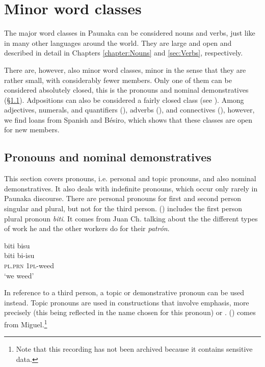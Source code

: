 
\chapter{Minor word classes}\label{chap:MinorWordClasses}

The major word classes in Paunaka can be considered nouns and verbs, just like in many other languages around the world. They are large and open and described in detail in Chapters \ref{chapter:Nouns} and \ref{sec:Verbs}, respectively.

There are, however, also minor word classes, minor in the sense that they are rather small, with considerably fewer members. Only one of them can be considered absolutely closed, this is the pronouns and nominal demonstratives (§\ref{chapter:Pronouns}). Adpositions can also be considered a fairly closed class (see ). Among adjectives, numerals, and quantifiers (), adverbs (), and connectives (), however, we find loans from Spanish and Bésiro, which shows that these classes are open for new members.


\section{Pronouns and nominal demonstratives}\label{chapter:Pronouns}

This section covers pronouns, i.e. personal and topic pronouns, and also nominal demonstratives. It also deals with indefinite pronouns, which occur only rarely in Paunaka discourse. There are personal pronouns for first and second person singular and plural, but not for the third person. () includes the first person plural pronoun \textit{biti}. It comes from Juan Ch. talking about the the different types of work he and the other workers do for their \textit{patrón}.

\ea\label{ex:new23-biti}
\begingl
\glpreamble biti bisu\\
\gla biti bi-isu\\
\textsc{pl.prn} 1\textsc{pl}-weed\\
\glft ‘we weed’
\endgl
\trailingcitation{[nxx-p630101g-1.089]}
\xe

In reference to a third person, a topic or demonstrative pronoun can be used instead. Topic pronouns are used in constructions that involve emphasis, more precisely  (this being reflected in the name chosen for this pronoun) or . () comes from Miguel.\footnote{Note that this recording has not been archived because it contains sensitive data.}

